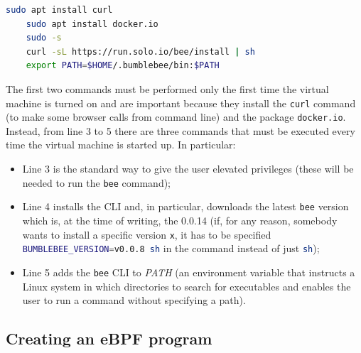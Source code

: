 \begin{lstlisting}[style=commandline, language=bash, caption={\colorbox{backcolour}{\lstinline[style=commandline, language=bash]|bee|} installation commands.}]
	sudo apt install curl
	sudo apt install docker.io 
	sudo -s
	curl -sL https://run.solo.io/bee/install | sh 
	export PATH=$HOME/.bumblebee/bin:$PATH
\end{lstlisting}

The first two commands must be performed only the first time the virtual machine is turned on and are important because they install the \colorbox{backcolour}{\lstinline[style=commandline, language=bash, breaklines=true]|curl|} command (to make some browser calls from command line) and the package \colorbox{backcolour}{\lstinline[style=commandline, language=bash, breaklines=true]|docker.io|}.
Instead, from line 3 to 5 there are three commands that must be executed every time the virtual machine is started up.
In particular:

\begin{itemize}
	\item 
		Line 3 is the standard way to give the user elevated privileges (these will be needed to run the \colorbox{backcolour}{\lstinline[style=commandline, language=bash, breaklines=true]|bee|} command);
	\item 
		Line 4 installs the CLI and, in particular, downloads the latest \colorbox{backcolour}{\lstinline[style=commandline, language=bash, breaklines=true]|bee|} version which is, at the time of writing, the 0.0.14 (if, for any reason, somebody wants to install a specific version \colorbox{backcolour}{\lstinline[style=commandline, language=bash, breaklines=true]|x|}, it has to be specified \colorbox{backcolour}{\lstinline[style=commandline, language=bash, breaklines=true]|BUMBLEBEE_VERSION=v0.0.8 sh|} in the command instead of just \colorbox{backcolour}{\lstinline[style=commandline, language=bash, breaklines=true]|sh|});
	\item 
		Line 5 adds the \colorbox{backcolour}{\lstinline[style=commandline, language=bash, breaklines=true]|bee|} CLI to \textit{PATH} (an environment variable that instructs a Linux system in which directories to search for executables and enables the user to run a command without specifying a path).
\end{itemize}

\subsection{Creating an eBPF program}

